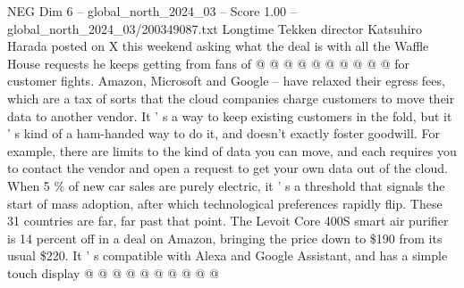 \begin{textsample}{NEG Dim 6 – global\_north\_2024\_03 – Score 1.00 – global\_north\_2024\_03/200349087.txt}
Longtime Tekken director Katsuhiro Harada posted on X this weekend asking what the deal is with all the Waffle House requests he keeps getting from fans of @ @ @ @ @ @ @ @ @ @ for customer fights.
Amazon, Microsoft and Google -- have relaxed their egress fees, which are a tax of sorts that the cloud companies charge customers to move their data to another vendor.
It ' s a way to keep existing customers in the fold, but it ' s kind of a ham-handed way to do it, and doesn't exactly foster goodwill.
For example, there are limits to the kind of data you can move, and each requires you to contact the vendor and open a request to get your own data out of the cloud.
When 5 \% of new car sales are purely electric, it ' s a threshold that signals the start of mass adoption, after which technological preferences rapidly flip.
These 31 countries are far, far past that point.
The Levoit Core 400S smart air purifier is 14 percent off in a deal on Amazon, bringing the price down to \$190 from its usual \$220.
It ' s compatible with Alexa and Google Assistant, and has a simple touch display @ @ @ @ @ @ @ @ @ @

\end{textsample}
